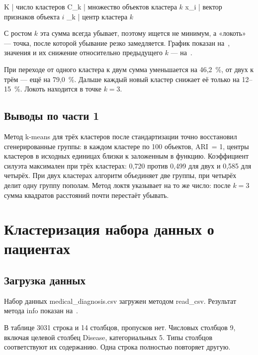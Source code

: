 \documentclass[a4paper,14pt]{extarticle}
\begin{document}
K | число кластеров
C_k | множество объектов кластера $k$
x_i | вектор признаков объекта $i$
\mu_k | центр кластера $k$

С ростом $k$ эта сумма всегда убывает, поэтому ищется не минимум, а «локоть» — точка, после которой убывание резко замедляется. График показан на~, значения и их снижение относительно предыдущего $k$ — на~.



При переходе от одного кластера к двум сумма уменьшается на 46,2~\%, от двух к трём — ещё на 79,0~\%. Дальше каждый новый кластер снижает её только на 12–15~\%. Локоть находится в точке $k = 3$.

\subsection{Выводы по части 1}

Метод k-means для трёх кластеров после стандартизации точно восстановил сгенерированные группы: в каждом кластере по 100 объектов, ARI~= 1, центры кластеров в исходных единицах близки к заложенным в функцию. Коэффициент силуэта максимален при трёх кластерах: 0,720 против 0,499 для двух и 0,585 для четырёх. При двух кластерах алгоритм объединяет две группы, при четырёх делит одну группу пополам. Метод локтя указывает на то же число: после $k = 3$ сумма квадратов расстояний почти перестаёт убывать.

\section{Кластеризация набора данных о пациентах}

\subsection{Загрузка данных}

Набор данных medical\_diagnosis.csv загружен методом read\_csv. Результат метода info показан на~.


В таблице 3031 строка и 14 столбцов, пропусков нет. Числовых столбцов 9, включая целевой столбец Disease, категориальных 5. Типы столбцов соответствуют их содержанию. Одна строка полностью повторяет другую.
\end{document}
